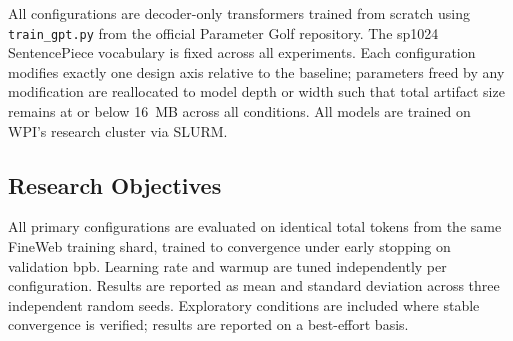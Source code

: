 \documentclass[12pt, letterpaper]{article}
\begin{document}
All configurations are decoder-only transformers trained from
scratch using \texttt{train\_gpt.py} from the official
Parameter Golf repository. The sp1024 SentencePiece vocabulary
is fixed across all experiments. Each configuration modifies
exactly one design axis relative to the baseline; parameters
freed by any modification are reallocated to model depth or
width such that total artifact size remains at or below 16~MB
across all conditions. All models are trained on WPI's
research cluster via SLURM.

\subsection{Research Objectives}

All primary configurations are evaluated on identical total
tokens from the same FineWeb training shard, trained to
convergence under early stopping on validation bpb. Learning
rate and warmup are tuned independently per configuration.
Results are reported as mean and standard deviation across
three independent random seeds. Exploratory conditions are
included where stable convergence is verified; results are
reported on a best-effort basis.
\end{document}
